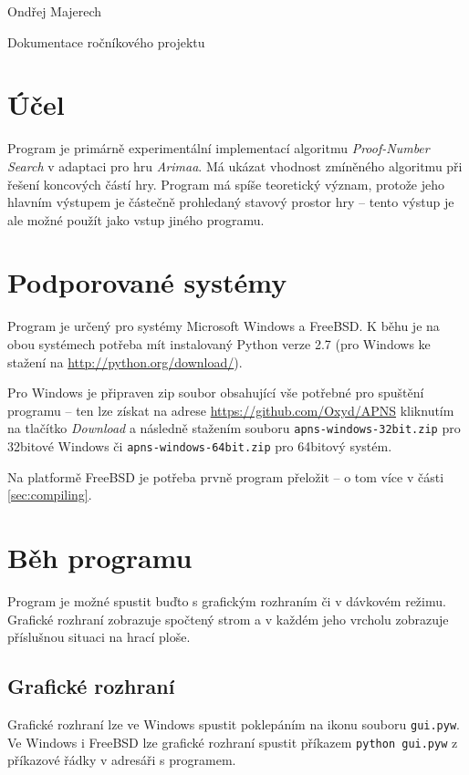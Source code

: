 \documentclass{article}
\begin{document}
\begin{flushright}
  Ondřej Majerech
\end{flushright}
\begin{center}
  \Huge Dokumentace ročníkového projektu
\end{center}

\section{Účel}
Program je primárně experimentální implementací algoritmu \emph{Proof-Number Search} v adaptaci pro hru \emph{Arimaa}.
Má ukázat vhodnost zmíněného algoritmu při řešení koncových částí hry. Program má spíše teoretický význam, protože jeho
hlavním výstupem je částečně prohledaný stavový prostor hry -- tento výstup je ale možné použít jako vstup jiného
programu.

\section{Podporované systémy}
Program je určený pro systémy Microsoft Windows a FreeBSD. K běhu je na obou systémech potřeba mít instalovaný
Python verze 2.7 (pro Windows ke stažení na \url{http://python.org/download/}). 

Pro Windows je připraven zip soubor obsahující vše potřebné pro spuštění programu -- ten lze získat na adrese
\url{https://github.com/Oxyd/APNS} kliknutím na tlačítko \emph{Download} a následně stažením souboru
\texttt{apns-windows-32bit.zip} pro 32bitové Windows či \texttt{apns-windows-64bit.zip} pro 64bitový systém.

 Na platformě FreeBSD je potřeba prvně program přeložit -- o tom více v části \ref{sec:compiling}.

\section{Běh programu}
\label{sec:running}
Program je možné spustit buďto s grafickým rozhraním či v dávkovém režimu. Grafické rozhraní zobrazuje spočtený strom a
v každém jeho vrcholu zobrazuje příslušnou situaci na hrací ploše. 

\subsection{Grafické rozhraní}
Grafické rozhraní lze ve Windows spustit poklepáním na ikonu souboru \texttt{gui.pyw}. Ve Windows i FreeBSD lze grafické
rozhraní spustit příkazem \texttt{python gui.pyw} z příkazové řádky v adresáři s programem.
\end{document}
